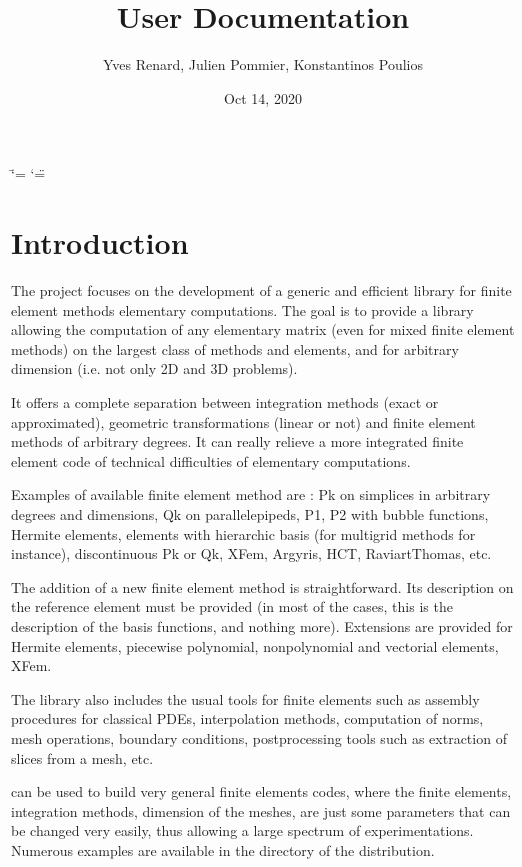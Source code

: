 \documentclass[a4paper,11pt,english]{sphinxmanual}
\title{User Documentation}
\date{Oct 14, 2020}
\author{Yves Renard, Julien Pommier, Konstantinos Poulios}
\begin{document}
\ifdefined\shorthandoff
  \ifnum\catcode`\=\string=\active\shorthandoff{=}\fi
  \ifnum\catcode`\"=\active{}\fi
\fi

\pagestyle{empty}
\sphinxmaketitle
\pagestyle{plain}
\sphinxtableofcontents
\pagestyle{normal}
\label{\detokenize{userdoc/index::doc}}



\chapter{Introduction}
\label{\detokenize{userdoc/intro:introduction}}\label{\detokenize{userdoc/intro:ud-intro}}\label{\detokenize{userdoc/intro::doc}}
The  project focuses on the development of a generic and
efficient  library for finite element methods elementary
computations. The goal is to provide a library allowing the
computation of any elementary matrix (even for mixed finite element
methods) on the largest class of methods and elements, and for
arbitrary dimension (i.e. not only 2D and 3D problems).

It offers a complete separation between integration methods (exact or
approximated), geometric transformations (linear or not) and finite
element methods of arbitrary degrees. It can really relieve a more
integrated finite element code of technical difficulties of
elementary computations.

Examples of available finite element method are : Pk on simplices in
arbitrary degrees and dimensions, Qk on parallelepipeds, P1, P2 with
bubble functions, Hermite elements, elements with hierarchic basis
(for multigrid methods for instance), discontinuous Pk or Qk, XFem,
Argyris, HCT, Raviart\sphinxhyphen{}Thomas, etc.

The addition of a new finite element method is straightforward. Its
description on the reference element must be provided (in most of the
cases, this is the description of the basis functions, and nothing
more). Extensions are provided for Hermite elements, piecewise
polynomial, non\sphinxhyphen{}polynomial and vectorial elements, XFem.

The library also includes the usual tools for finite elements such as
assembly procedures for classical PDEs, interpolation methods,
computation of norms, mesh operations, boundary conditions,
post\sphinxhyphen{}processing tools such as extraction of slices from a mesh, etc.

 can be used to build very general finite elements codes, where
the finite elements, integration methods, dimension of the meshes,
are just some parameters that can be changed very easily, thus
allowing a large spectrum of experimentations. Numerous examples are
available in the  directory of the distribution.
\end{document}
